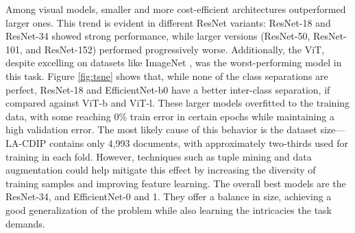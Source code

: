 Among visual models, smaller and more cost-efficient architectures outperformed larger ones. This trend is evident in different ResNet variants: ResNet-18 and ResNet-34 showed strong performance, while larger versions (ResNet-50, ResNet-101, and ResNet-152) performed progressively worse. Additionally, the \gls{ViT}, despite excelling on datasets like ImageNet \cite{deng_imagenet_2009}, was the worst-performing model in this task. Figure \ref{fig:tsne} shows that, while none of the class separations are perfect, ResNet-18 and EfficientNet-b0 have a better inter-class separation, if compared against ViT-b and ViT-l. These larger models overfitted to the training data, with some reaching 0\% train error in certain epochs while maintaining a high validation error. The most likely cause of this behavior is the dataset size—LA-CDIP contains only 4,993 documents, with approximately two-thirds used for training in each fold. However, techniques such as tuple mining and data augmentation could help mitigate this effect by increasing the diversity of training samples and improving feature learning. The overall best models are the ResNet-34, and EfficientNet-0 and 1. They offer a balance in size, achieving a good generalization of the problem while also learning the intricacies the task demands.

